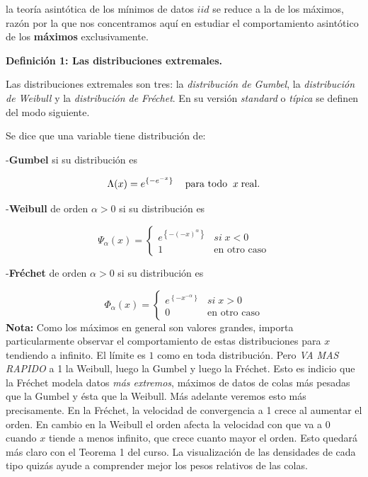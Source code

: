 \documentclass[
]{book}
\theoremstyle{definition}
\theoremstyle{definition}
\theoremstyle{definition}
\theoremstyle{definition}
\theoremstyle{remark}
\begin{document}
la teoría asintótica de los mínimos de datos \(iid\)
se reduce a la de los máximos, razón por la que
nos concentramos aquí en estudiar el
comportamiento asintótico de los \textbf{máximos}
exclusivamente.

\textbf{Definición 1: Las distribuciones extremales.}

Las distribuciones extremales son tres: la
\emph{distribución de Gumbel}, la \emph{distribución de Weibull} y
la \emph{distribución de Fréchet}. En su versión \emph{standard} o \emph{típica} se definen del modo
siguiente.

Se dice que una variable tiene distribución de:

-\textbf{Gumbel} si su distribución es

\[\Lambda(x) = e^{\{-e^{-x}\}}\hspace{0.3cm}\text{ para todo }\: x \;\text{real}.\]

-\textbf{Weibull} de orden \(\alpha>0\) si su distribución es

\[\Psi_{\alpha}(x)=\begin{cases}
e^{\left\{-(-x)^{\alpha}  \right\}} & si\;x<0\\
1 & \text{en otro caso}
\end{cases}\]

-\textbf{Fréchet} de orden \(\alpha>0\) si su distribución es

\[
\Phi_{\alpha}(x)=\begin{cases}
e^{\left\{ -x^{-\alpha}\right\}} & si\;x>0\\
0 & \text{en otro caso}
\end{cases}
\]
\textbf{Nota:} Como los máximos en general son valores grandes,
importa particularmente observar el comportamiento de estas distribuciones para \(x\) tendiendo a infinito. El límite es \(1\) como en toda distribución. Pero \emph{VA MAS RAPIDO} a 1 la Weibull, luego la Gumbel y luego la Fréchet. Esto es indicio que la
Fréchet modela datos \emph{más extremos}, máximos de datos de
colas más pesadas que la Gumbel y ésta que la Weibull. Más
adelante veremos esto más precisamente. En la Fréchet, la
velocidad de convergencia a 1 crece al aumentar el orden. En cambio en la Weibull el orden afecta la velocidad con que va a 0 cuando \(x\) tiende a menos infinito, que crece cuanto mayor el orden. Esto quedará más claro con el Teorema 1 del curso. La visualización de las densidades de cada tipo quizás ayude a comprender mejor los pesos relativos de las colas.
\end{document}

